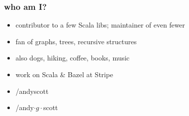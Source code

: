 \documentclass[include/preamble.tex]{subfiles}
\begin{document}
\begin{frame}
  \frametitle{who am I?}
  \begin{itemize}
    \pause
  \item contributor to a few Scala libs; maintainer of even fewer
  \item fan of graphs, trees, recursive structures
  \item also dogs, hiking, coffee, books, music
  \item work on Scala \& Bazel at Stripe
    \newline
    \pause
  \item {} /andyscott
  \item {} /andy$\cdot{g}\cdot$scott
  \end{itemize}
\end{frame}
\end{document}
